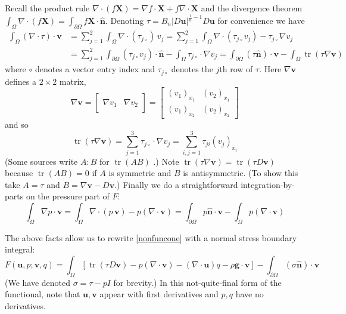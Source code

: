 \documentclass[letterpaper,final,12pt,reqno]{amsart}
\newcommand{\grad}{\nabla}
\newcommand{\trace}{\operatorname{tr}}
\newcommand{\hbn}{\hat{\mathbf{n}}}
\newcommand{\bu}{\mathbf{u}}
\newcommand{\bv}{\mathbf{v}}
\newcommand{\bX}{\mathbf{X}}
\begin{document}
Recall the product rule $\nabla \cdot(f\bX) = \grad f\cdot \bX + f \nabla \cdot \bX$ and the divergence theorem $\int_\Omega \nabla \cdot (f\bX) = \int_{\partial \Omega} f\bX \cdot \hbn$.  Denoting $\tau = B_n |D\bu|^{\frac{1}{n} - 1} D\bu$ for convenience we have
\begin{align*}
\int_\Omega \left(\nabla \cdot \tau\right)\cdot \bv &= \sum_{j=1}^2 \int_\Omega \nabla \cdot (\tau_{j\circ})\, v_j = \sum_{j=1}^2 \int_\Omega \nabla \cdot (\tau_{j\circ} v_j) - \tau_{j\circ} \nabla v_j \\
  &= \sum_{j=1}^2 \int_{\partial \Omega} (\tau_{j\circ} v_j) \cdot \hbn - \int_\Omega \tau_{j\circ} \cdot \nabla v_j = \int_{\partial \Omega} (\tau \hbn)\cdot \bv - \int_\Omega \trace(\tau \nabla \bv)
\end{align*}
where $\circ$ denotes a vector entry index and $\tau_{j\circ}$ denotes the $j$th row of $\tau$.  Here $\grad\bv$ defines a $2\times 2$ matrix,
\newcommand{\treftwo}[2]{\left[\begin{array}{c|c} & \\ #1 & #2 \\ & \end{array}\right]}
\newcommand{\trefthree}[3]{\left[\begin{array}{c|c|c} & & \\ #1 & #2 & #3 \\ & & \end{array}\right]}
    $$\grad \bv = \treftwo{\grad v_1}{\grad v_2} = \begin{bmatrix}
    (v_1)_{x_1} & (v_2)_{x_1} \\
    (v_1)_{x_2} & (v_2)_{x_2}
    \end{bmatrix}$$
and so
    $$\trace(\tau \grad \bv) = \sum_{j=1}^3 \tau_{j\circ} \cdot \grad v_j = \sum_{i,j=1}^3 \tau_{ji} (v_j)_{x_i}$$
(Some sources write $A:B$ for $\trace(AB)$ \cite{JouvetRappaz2011}.)  Note $\trace(\tau \grad \bv) = \trace(\tau D\bv)$ because $\trace(AB)=0$ if $A$ is symmetric and $B$ is antisymmetric.  (To show this take $A=\tau$ and $B=\grad\bv-D\bv$.)  Finally we do a straightforward integration-by-parts on the pressure part of $F$:
    $$\int_\Omega \nabla p \cdot \bv = \int_\Omega \nabla\cdot (p\,\bv) - p (\nabla \cdot \bv) = \int_{\partial \Omega} p\hbn \cdot \bv - \int_\Omega p (\nabla \cdot \bv)$$

The above facts allow us to rewrite \eqref{nonfuncone} with a normal stress boundary integral:
\begin{equation}
F(\bu,p;\bv,q) =  \int_\Omega \left[\trace(\tau D\bv) - p (\nabla \cdot \bv) - \left(\nabla \cdot \bu\right) q - \rho \mathbf{g} \cdot \bv\right] - \int_{\partial\Omega} (\sigma \hbn)\cdot \bv \label{nonfunctwo}
\end{equation}
(We have denoted $\sigma=\tau-pI$ for brevity.)  In this not-quite-final form of the functional, note that $\bu,\bv$ appear with first derivatives and $p,q$ have no derivatives.
\end{document}
